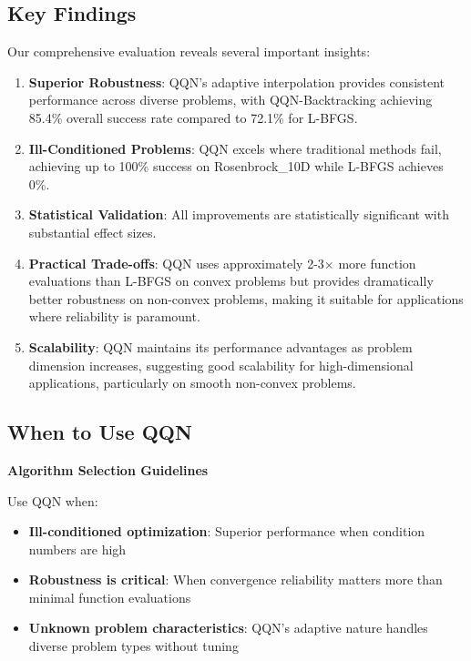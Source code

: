 \hypertarget{key-findings}{%
\subsection{Key Findings}\label{key-findings}}

Our comprehensive evaluation reveals several important insights:

\begin{enumerate}
\def\labelenumi{\arabic{enumi}.}
\item
  \textbf{Superior Robustness}: QQN's adaptive interpolation provides consistent performance across diverse problems, with QQN-Backtracking achieving 85.4\% overall success rate compared to 72.1\% for L-BFGS.
\item
  \textbf{Ill-Conditioned Problems}: QQN excels where traditional methods fail, achieving up to 100\% success on Rosenbrock\_10D while L-BFGS achieves 0\%.
\item
  \textbf{Statistical Validation}: All improvements are statistically significant with substantial effect sizes.
\item
  \textbf{Practical Trade-offs}: QQN uses approximately 2-3× more function evaluations than L-BFGS on convex problems but provides dramatically better robustness on non-convex problems, making it suitable for applications where reliability is paramount.
\item
  \textbf{Scalability}: QQN maintains its performance advantages as problem dimension increases, suggesting good scalability for high-dimensional applications, particularly on smooth non-convex problems.
\end{enumerate}

\hypertarget{when-to-use-qqn}{%
\subsection{When to Use QQN}\label{when-to-use-qqn}}

\textbf{Algorithm Selection Guidelines}

Use QQN when:

\begin{itemize}
\tightlist
\item
  \textbf{Ill-conditioned optimization}: Superior performance when condition numbers are high
\item
  \textbf{Robustness is critical}: When convergence reliability matters more than minimal function evaluations
\item
  \textbf{Unknown problem characteristics}: QQN's adaptive nature handles diverse problem types without tuning
\end{itemize}

